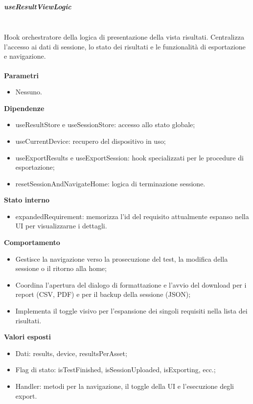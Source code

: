 \documentclass[a4paper,12pt]{article}
\begin{document}
                \subparagraph{useResultViewLogic}\mbox{}\\
                Hook orchestratore della logica di presentazione della vista risultati. Centralizza l'accesso ai dati di sessione, lo stato dei risultati e le funzionalità di esportazione e navigazione.\\\\
                \textbf{Parametri}
                \begin{itemize}
                    \item Nessuno.
                \end{itemize}
                \textbf{Dipendenze}
                \begin{itemize}
                    \item {\ttfamily useResultStore} e {\ttfamily useSessionStore}: accesso allo stato globale;
                    \item {\ttfamily useCurrentDevice}: recupero del dispositivo in uso;
                    \item {\ttfamily useExportResults} e {\ttfamily useExportSession}: hook specializzati per le procedure di esportazione;
                    \item {\ttfamily resetSessionAndNavigateHome}: logica di terminazione sessione.
                \end{itemize}
                \textbf{Stato interno}
                \begin{itemize}
                    \item {\ttfamily expandedRequirement}: memorizza l'id del requisito attualmente espanso nella UI per visualizzarne i dettagli.
                \end{itemize}
                \textbf{Comportamento}
                \begin{itemize}
                    \item Gestisce la navigazione verso la prosecuzione del test, la modifica della sessione o il ritorno alla home;
                    \item Coordina l'apertura del dialogo di formattazione e l'avvio del download per i report (CSV, PDF) e per il backup della sessione (JSON);
                    \item Implementa il toggle visivo per l'espansione dei singoli requisiti nella lista dei risultati.
                \end{itemize}
                \textbf{Valori esposti}
                \begin{itemize}
                    \item Dati: {\ttfamily results}, {\ttfamily device}, {\ttfamily resultsPerAsset};
                    \item Flag di stato: {\ttfamily isTestFinished}, {\ttfamily isSessionUploaded}, {\ttfamily isExporting}, ecc.;
                    \item Handler: metodi per la navigazione, il toggle della UI e l'esecuzione degli export.
                \end{itemize}
                
\end{document}
